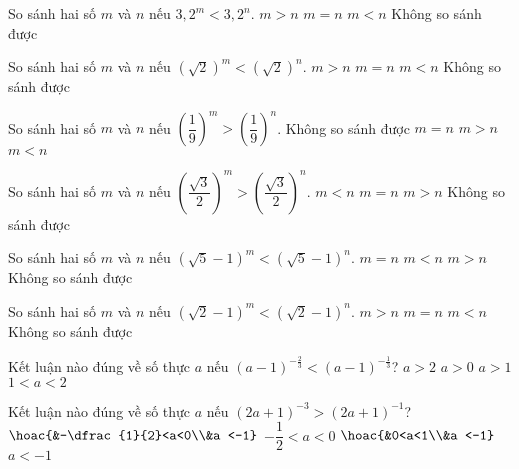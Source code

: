 \begin{ex}%
	So sánh hai số $m$ và $n$ nếu $3,2^m<3,2^n$.
	\choice
	{$m>n$}
	{$m=n$}
	{\True $m<n$}
	{Không so sánh được}
\end{ex}
\begin{ex}%
	So sánh hai số $m$ và $n$ nếu $(\sqrt{2})^m<(\sqrt{2})^n$.
	\choice
	{$m>n$}
	{$m=n$}
	{\True $m<n$}
	{Không so sánh được}
\end{ex}
\begin{ex}%
	So sánh hai số $m$ và $n$ nếu $\left(\dfrac{1}{9}\right)^m>\left(\dfrac{1}{9}\right)^n$.
	\choice
	{Không so sánh được}
	{$m=n$}
	{$m>n$}
	{\True $m<n$}
\end{ex}
\begin{ex}%
	So sánh hai số $m$ và $n$ nếu $\left(\dfrac{\sqrt{3}}{2}\right)^m>\left(\dfrac{\sqrt{3}}{2}\right)^n$.
	\choice
	{\True $m<n$}
	{$m=n$}
	{$m>n$}
	{Không so sánh được}
\end{ex}
\begin{ex}%
	So sánh hai số $m$ và $n$ nếu $(\sqrt{5}-1)^m<(\sqrt{5}-1)^n$.
	\choice
	{$m=n$}
	{\True $m<n$}
	{$m>n$}
	{Không so sánh được}
\end{ex}
\begin{ex}%
	So sánh hai số $m$ và $n$ nếu $(\sqrt{2}-1)^m<(\sqrt{2}-1)^n$.
	\choice
	{\True $m>n$}
	{$m=n$}
	{$m<n$}
	{Không so sánh được}
\end{ex}
\begin{ex}%
	Kết luận nào đúng về số thực $a$ nếu $(a-1)^{-\tfrac{2}{3}}<(a-1)^{-\tfrac{1}{3}}$?
	\choice
	{\True $a>2$}
	{$a>0$}
	{$a>1$}
	{$1<a<2$}
\end{ex}
\begin{ex}%
	Kết luận nào đúng về số thực $a$ nếu $(2a+1)^{-3}>(2a+1)^{-1}$?
	\choice
	{\True $\hoac{&-\dfrac{1}{2}<a<0\\&a <-1}$}
	{$-\dfrac{1}{2}<a<0$}
	{$\hoac{&0<a<1\\&a <-1}$}
	{$a <-1$}
\end{ex}
